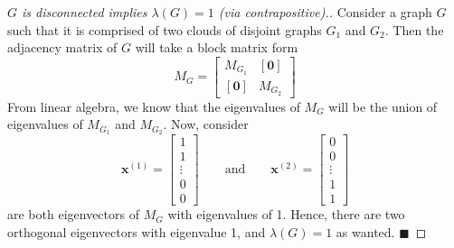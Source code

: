 \documentclass[11pt, letter]{book}
\newcommand{\bx}{\mathbf{x}}
\newcommand{\bzero}{\mathbf{0}}
\newcommand{\qed}{\hfill $\blacksquare$}
\begin{document}
\begin{proof} 
[$G$ is disconnected implies $\lambda(G) = 1$ (via contrapositive).] 
Consider a graph $G$ such that it is comprised of two clouds of disjoint graphs $G_1$ and $G_2$. Then the adjacency matrix of $G$ will take a block matrix form
\begin{equation}
	M_G = \begin{bmatrix}
		M_{G_1} & [\bzero ]  \\
		[\bzero ] & M_{G_2}
	\end{bmatrix}
\end{equation}
From linear algebra, we know that the eigenvalues of $M_G$ will be the union of eigenvalues of $M_{G_1}$ and $M_{G_2}$. Now, consider
\begin{equation}
	\bx^{(1)} = 
	\begin{bmatrix}
		1 \\ 1 \\ \vdots \\ 0 \\ 0
	\end{bmatrix} 
	\quad \quad \text{and} \quad \quad
	\bx^{(2)} = 
	\begin{bmatrix}
		0 \\ 0 \\ \vdots \\ 1 \\ 1
	\end{bmatrix}
\end{equation}
are both eigenvectors of $M_G$ with eigenvalues of 1. Hence, there are two orthogonal eigenvectors with eigenvalue 1, and $\lambda(G) = 1$ as wanted. 
\qed

\end{proof}
\end{document}
